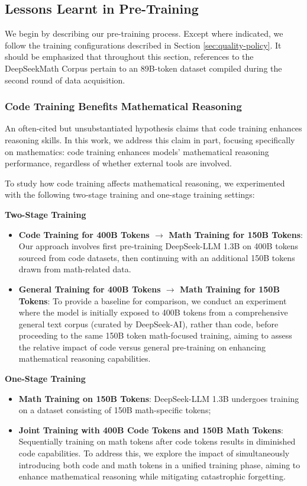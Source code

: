 \begin{itemize}[topsep=0pt]
\begin{itemize}[topsep=0pt]
\subsection{Lessons Learnt in Pre-Training}

We begin by describing our pre-training process. Except where indicated, we follow the training configurations described in Section \ref{sec:quality-policy}. It should be emphasized that throughout this section, references to the DeepSeekMath Corpus pertain to an 89B-token dataset compiled during the second round of data acquisition.

\subsubsection{Code Training Benefits Mathematical Reasoning}

An often-cited but unsubstantiated hypothesis claims that code training enhances reasoning skills. In this work, we address this claim in part, focusing specifically on mathematics: code training enhances models’ mathematical reasoning performance, regardless of whether external tools are involved.

To study how code training affects mathematical reasoning, we experimented with the following two-stage training and one-stage training settings:

\textbf{Two-Stage Training}

\begin{itemize}[topsep=0pt]
    \item \textbf{Code Training for 400B Tokens $\rightarrow$ Math Training for 150B Tokens}: Our approach involves first pre-training DeepSeek-LLM 1.3B on 400B tokens sourced from code datasets, then continuing with an additional 150B tokens drawn from math-related data.
    \item \textbf{General Training for 400B Tokens $\rightarrow$ Math Training for 150B Tokens}: To provide a baseline for comparison, we conduct an experiment where the model is initially exposed to 400B tokens from a comprehensive general text corpus (curated by DeepSeek-AI), rather than code, before proceeding to the same 150B token math-focused training, aiming to assess the relative impact of code versus general pre-training on enhancing mathematical reasoning capabilities.
\end{itemize}

\textbf{One-Stage Training}

\begin{itemize}[topsep=0pt]
    \item \textbf{Math Training on 150B Tokens}: DeepSeek-LLM 1.3B undergoes training on a dataset consisting of 150B math-specific tokens;
    \item \textbf{Joint Training with 400B Code Tokens and 150B Math Tokens}: Sequentially training on math tokens after code tokens results in diminished code capabilities. To address this, we explore the impact of simultaneously introducing both code and math tokens in a unified training phase, aiming to enhance mathematical reasoning while mitigating catastrophic forgetting.
\end{itemize}


\end{itemize}
\end{itemize}
